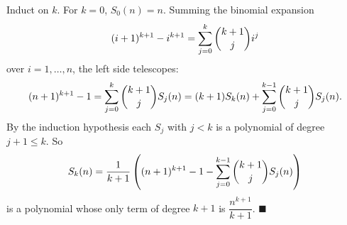 Induct on $k$. For $k=0$, $S_0(n)=n$. Summing the binomial expansion
\[(i+1)^{k+1}-i^{k+1}=\sum_{j=0}^{k}\dbinom{k+1}{j}i^j\]
over $i=1,\dots,n$, the left side telescopes:
\[(n+1)^{k+1}-1=\sum_{j=0}^{k}\dbinom{k+1}{j}S_j(n)=(k+1)S_k(n)+\sum_{j=0}^{k-1}\dbinom{k+1}{j}S_j(n).\]
By the induction hypothesis each $S_j$ with $j<k$ is a polynomial of degree $j+1\le k$. So
\[S_k(n)=\dfrac{1}{k+1}\left((n+1)^{k+1}-1-\sum_{j=0}^{k-1}\dbinom{k+1}{j}S_j(n)\right)\]
is a polynomial whose only term of degree $k+1$ is $\dfrac{n^{k+1}}{k+1}$. $\blacksquare$
